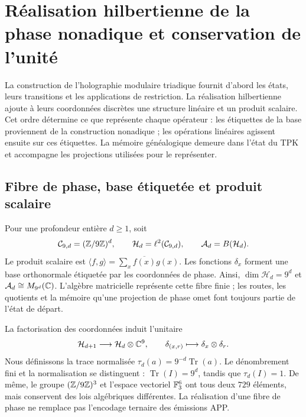 \section{Réalisation hilbertienne de la phase nonadique et conservation de l’unité}
\label{iv:hilbert}

La construction de l'holographie modulaire triadique fournit d'abord les états, leurs transitions et les applications de restriction. La réalisation hilbertienne ajoute à leurs coordonnées discrètes une structure linéaire et un produit scalaire. Cet ordre détermine ce que représente chaque opérateur : les étiquettes de la base proviennent de la construction nonadique ; les opérations linéaires agissent ensuite sur ces étiquettes. La mémoire généalogique demeure dans l'état du TPK et accompagne les projections utilisées pour le représenter.

\subsection{Fibre de phase, base étiquetée et produit scalaire}

Pour une profondeur entière \(d\geq1\), soit
\begin{equation}
 \mathcal C_{9,d}=(\mathbb Z/9\mathbb Z)^d,
 \qquad \mathcal H_d=\ell^2(\mathcal C_{9,d}),
 \qquad \mathcal A_d=B(\mathcal H_d).
 \label{iv:eq:hilbert-finito}
\end{equation}
Le produit scalaire est
\(\langle f,g\rangle=\sum_x\overline{f(x)}g(x)\). Les fonctions
\(\delta_x\) forment une base orthonormale étiquetée par les coordonnées
de phase. Ainsi, \(\dim\mathcal H_d=9^d\) et
\(\mathcal A_d\cong M_{9^d}(\mathbb C)\). L’algèbre matricielle représente
cette fibre finie ; les routes, les quotients et la mémoire qu’une
projection de phase omet font toujours partie de l’état de départ.

La factorisation des coordonnées induit l’unitaire
\begin{equation}
 \mathcal H_{d+1}\longrightarrow\mathcal H_d\otimes\mathbb C^9,
 \qquad \delta_{(x,r)}\longmapsto\delta_x\otimes\delta_r.
 \label{iv:eq:factorizacion-hilbert}
\end{equation}
Nous définissons la trace normalisée
\(\tau_d(a)=9^{-d}\operatorname{Tr}(a)\). Le dénombrement fini et la
normalisation se distinguent : \(\operatorname{Tr}(I)=9^d\), tandis
que \(\tau_d(I)=1\). De même, le groupe \((\mathbb Z/9\mathbb Z)^3\) et l’espace
vectoriel \(\mathbb F_3^6\) ont tous deux \(729\) éléments, mais
conservent des lois algébriques différentes. La réalisation d’une fibre de
phase ne remplace pas l’encodage ternaire des émissions APP.

